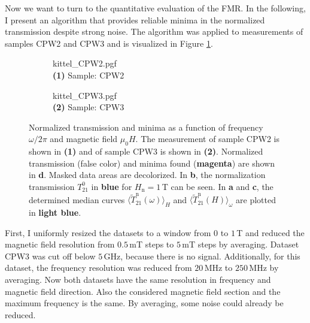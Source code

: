 Now we want to turn to the quantitative evaluation of the FMR. In the following, I present an algorithm that provides reliable minima in the normalized transmission despite strong noise. The algorithm was applied to measurements of samples CPW2 and CPW3 and is visualized in Figure \ref{fig:analysis_kittel}.
\begin{figure}
     \centering
     \begin{subfigure}{\textwidth}
         \centering
         {kittel_CPW2.pgf}\\
         \small\textbf{(1)} Sample: CPW2\\
     \vspace{5mm}
     \end{subfigure}
     \begin{subfigure}{\textwidth}
         \centering
    {kittel_CPW3.pgf}\\
         \small\textbf{(2)} Sample: CPW3\\
     \vspace{5mm}
     \end{subfigure}
    \caption[Normalized transmission and minima of CPW2 and CPW3]{Normalized transmission and minima as a function of frequency $\omega/2\pi$ and magnetic field $\mu_0H$. The measurement of sample CPW2 is shown in \textbf{(1)} and of sample CPW3 is shown in \textbf{(2)}. Normalized transmission (false color) and minima found (\textbf{\color{antiseeblau100}magenta}) are shown in \textbf{\color{antiseeblau100}d}. Masked data areas are decolorized. In \textbf{\color{antiseeblau100}b}, the normalization transmission $T_{21}^0$ in \textbf{\color{seeblau100}blue} for $H_\text{n}=1\,$T can be seen. In \textbf{\color{antiseeblau100}a} and \textbf{\color{antiseeblau100}c}, the determined median curves $\langle\widetilde{T}_{21}^\text{n}(\omega)\rangle_H$ and $\langle\widetilde{T}_{21}^\text{n}(H)\rangle_\omega$ are plotted in \textbf{\color{seeblau65}light blue}.}
    \label{fig:analysis_kittel}
\end{figure}
First, I uniformly resized the datasets to a window from $0$ to $1\,$T and reduced the magnetic field resolution from $0.5\,$mT steps to $5\,$mT steps by averaging. Dataset CPW3 was cut off below $5\,$GHz, because there is no signal. Additionally, for this dataset, the frequency resolution was reduced from $20\,$MHz to $250\,$MHz by averaging. Now both datasets have the same resolution in frequency and magnetic field direction. Also the considered magnetic field section and the maximum frequency is the same. By averaging, some noise could already be reduced.

